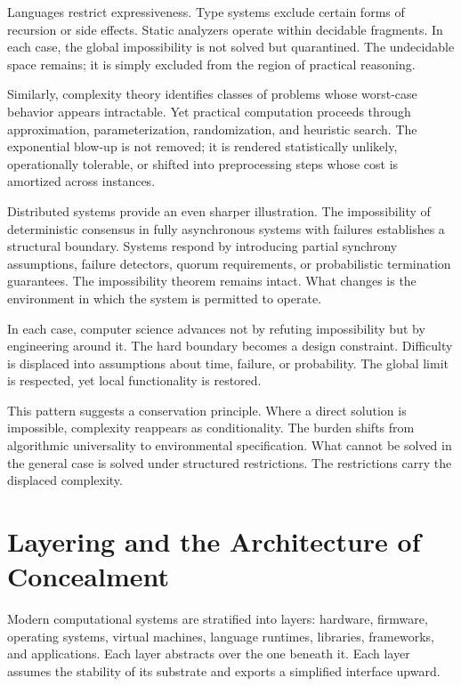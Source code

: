 \documentclass[11pt]{article}
\begin{document}
Languages restrict expressiveness. Type systems exclude certain forms of recursion or side effects. Static analyzers operate within decidable fragments. In each case, the global impossibility is not solved but quarantined. The undecidable space remains; it is simply excluded from the region of practical reasoning.

Similarly, complexity theory identifies classes of problems whose worst-case behavior appears intractable. Yet practical computation proceeds through approximation, parameterization, randomization, and heuristic search. The exponential blow-up is not removed; it is rendered statistically unlikely, operationally tolerable, or shifted into preprocessing steps whose cost is amortized across instances.

Distributed systems provide an even sharper illustration. The impossibility of deterministic consensus in fully asynchronous systems with failures establishes a structural boundary. Systems respond by introducing partial synchrony assumptions, failure detectors, quorum requirements, or probabilistic termination guarantees. The impossibility theorem remains intact. What changes is the environment in which the system is permitted to operate.

In each case, computer science advances not by refuting impossibility but by engineering around it. The hard boundary becomes a design constraint. Difficulty is displaced into assumptions about time, failure, or probability. The global limit is respected, yet local functionality is restored.

This pattern suggests a conservation principle. Where a direct solution is impossible, complexity reappears as conditionality. The burden shifts from algorithmic universality to environmental specification. What cannot be solved in the general case is solved under structured restrictions. The restrictions carry the displaced complexity.

\section{Layering and the Architecture of Concealment}

Modern computational systems are stratified into layers: hardware, firmware, operating systems, virtual machines, language runtimes, libraries, frameworks, and applications. Each layer abstracts over the one beneath it. Each layer assumes the stability of its substrate and exports a simplified interface upward.
\end{document}
